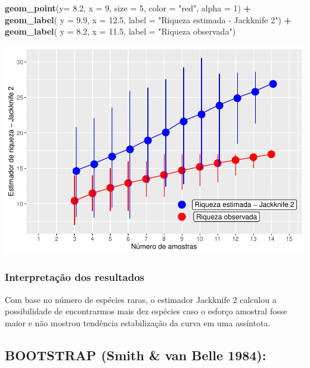 \documentclass[
]{book}
\newenvironment{Shaded}{\begin{snugshade}}{\end{snugshade}}
\newcommand{\DataTypeTok}[1]{\textcolor[rgb]{0.13,0.29,0.53}{#1}}
\newcommand{\DecValTok}[1]{\textcolor[rgb]{0.00,0.00,0.81}{#1}}
\newcommand{\FloatTok}[1]{\textcolor[rgb]{0.00,0.00,0.81}{#1}}
\newcommand{\KeywordTok}[1]{\textcolor[rgb]{0.13,0.29,0.53}{\textbf{#1}}}
\newcommand{\NormalTok}[1]{#1}
\newcommand{\OperatorTok}[1]{\textcolor[rgb]{0.81,0.36,0.00}{\textbf{#1}}}
\newcommand{\StringTok}[1]{\textcolor[rgb]{0.31,0.60,0.02}{#1}}
\begin{document}
\begin{Shaded}
\begin{Highlighting}[]
\StringTok{  }\KeywordTok{geom_point}\NormalTok{(}\DataTypeTok{y=} \FloatTok{8.2}\NormalTok{, }\DataTypeTok{x =} \DecValTok{9}\NormalTok{, }\DataTypeTok{size =} \DecValTok{5}\NormalTok{, }\DataTypeTok{color =} \StringTok{"red"}\NormalTok{, }\DataTypeTok{alpha =} \DecValTok{1}\NormalTok{) }\OperatorTok{+}\StringTok{ }
\StringTok{  }\KeywordTok{geom_label}\NormalTok{( }\DataTypeTok{y =} \FloatTok{9.9}\NormalTok{, }\DataTypeTok{x =} \FloatTok{12.5}\NormalTok{, }\DataTypeTok{label =} \StringTok{"Riqueza estimada - Jackknife 2"}\NormalTok{) }\OperatorTok{+}
\StringTok{  }\KeywordTok{geom_label}\NormalTok{( }\DataTypeTok{y =} \FloatTok{8.2}\NormalTok{, }\DataTypeTok{x =} \FloatTok{11.5}\NormalTok{, }\DataTypeTok{label =} \StringTok{"Riqueza observada"}\NormalTok{)}
\end{Highlighting}
\end{Shaded}

\includegraphics{livro_r_ecologia_files/figure-latex/unnamed-chunk-52-1.pdf}

\hypertarget{interpretauxe7uxe3o-dos-resultados-4}{%
\subsubsection{Interpretação dos resultados}\label{interpretauxe7uxe3o-dos-resultados-4}}

Com base no número de espécies raras, o estimador Jackknife 2 calculou a possibilidade de encontrarmos mais dez espécies caso o esforço amostral fosse maior e não mostrou tendência estabilização da curva em uma assíntota.

\hypertarget{bootstrap-smith-van-belle-1984}{%
\subsection{BOOTSTRAP (Smith \& van Belle 1984):}\label{bootstrap-smith-van-belle-1984}}
\end{document}
